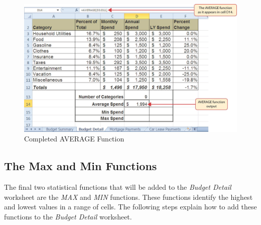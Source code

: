 \begin{figure}[H]
	\centering
	\includegraphics[width=\maxwidth{.95\linewidth}]{gfx/ch02_fig23}
	\caption{Completed AVERAGE Function}
	\label{02:fig23}
\end{figure}

\subsection{The Max and Min Functions}

The final two statistical functions that will be added to the \textit{Budget Detail} worksheet are the \textit{MAX} and \textit{MIN} functions. These functions identify the highest and lowest values in a range of cells. The following steps explain how to add these functions to the \textit{Budget Detail} worksheet.


